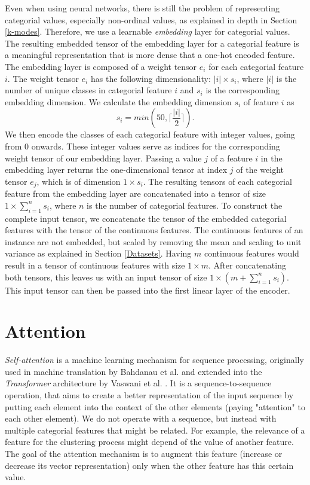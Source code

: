 Even when using neural networks, there is still the problem of representing categorial values, especially non-ordinal values, as explained in depth in Section \ref{k-modes}. Therefore, we use a learnable \textit{embedding} layer for categorial values. The resulting embedded tensor of the embedding layer for a categorial feature is a meaningful representation that is more dense that a one-hot encoded feature. The embedding layer is composed of a weight tensor $e_i$ for each categorial feature $i$. The weight tensor $e_i$  has the following dimensionality: $|i| \times s_i$, where $|i|$ is the number of unique classes in categorial feature $i$ and $s_i$ is the corresponding embedding dimension. We calculate the embedding dimension $s_i$ of feature $i$ as
$$s_i = min(50, \lceil \frac{|i|}{2} \rceil).$$
We then encode the classes of each categorial feature with integer values, going from 0 onwards. These integer values serve as indices for the corresponding weight tensor of our embedding layer. Passing a value $j$ of a feature $i$ in the embedding layer returns the one-dimensional tensor at index $j$ of the weight tensor $e_j$, which is of dimension $1 \times s_i$. The resulting tensors of each categorial feature from the embedding layer are concatenated into a tensor of size $1 \times \sum^n_{i=1}s_i$, where $n$ is the number of categorial features. To construct the complete input tensor, we concatenate the tensor of the embedded categorial features with the tensor of the continuous features. The continuous features of an instance are not embedded, but scaled by removing the mean and scaling to unit variance as explained in Section \ref{Datasets}. Having $m$ continuous features would result in a tensor of continuous features with size $1 \times m$. After concatenating both tensors, this leaves us with an input tensor of size $1 \times (m + \sum^n_{i=1}s_i)$. This input tensor can then be passed into the first linear layer of the encoder.



\section{Attention}

\textit{Self-attention} is a machine learning mechanism for sequence processing, originally used in machine translation by Bahdanau et al. \cite{bahdanau} and extended into the \textit{Transformer} architecture by Vaswani et al. \cite{attention_is_all_you_need}. It is a sequence-to-sequence operation, that aims to create a better representation of the input sequence by putting each element into the context of the other elements (paying "attention" to each other element). We do not operate with a sequence, but instead with multiple categorial features that might be related. For example, the relevance of a feature for the clustering process might depend of the value of another feature. The goal of the attention mechanism is to augment this feature (increase or decrease its vector representation) only when the other feature has this certain value. 

